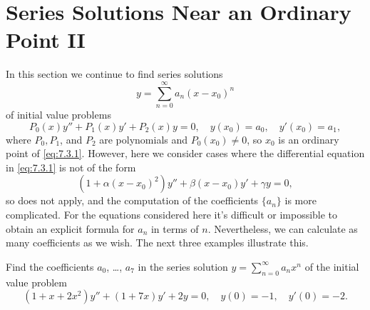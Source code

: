 \section{Series Solutions Near an Ordinary Point II}
\label{sec:series_ordinary_ii}

In this section we continue to find series solutions
\[
y=\sum_{n=0}^\infty a_n(x-x_0)^n
\]
of  initial value problems
\begin{equation} \label{eq:7.3.1}
P_0(x)y''+P_1(x)y'+P_2(x)y=0,\quad y(x_0)=a_0,\quad y'(x_0)=a_1,
\end{equation}
where $P_0,P_1$, and $P_2$ are polynomials and $P_0(x_0)\ne0$,
so $x_0$ is an ordinary point of \eqref{eq:7.3.1}.  However, here we
consider  cases where the differential equation in \eqref{eq:7.3.1}
is not of the form
\[
\left(1+\alpha(x-x_0)^2\right)y''+\beta(x-x_0) y'+\gamma y=0,
\]
so  does not apply, and the computation of the
coefficients $\{a_n\}$ is more complicated. For the equations
considered here it's difficult or impossible to obtain an explicit
formula for $a_n$ in terms of $n$. Nevertheless, we can calculate as
many coefficients as we wish. The next three examples illustrate
this.

\begin{example}\label{example:7.3.1}
Find the coefficients $a_0$, \dots, $a_7$ in the  series solution
$y=\sum^\infty_{n=0}
a_nx^n$  of the initial value problem
\begin{equation} \label{eq:7.3.2}
(1+x+2x^2)y''+(1+7x)y'+2y=0,\quad y(0)=-1,\quad y'(0)=-2.
\end{equation}
\end{example}

